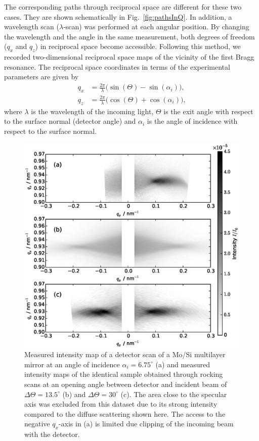 The corresponding paths through reciprocal space are different for these two cases. They are shown schematically in Fig.~\ref{fig:pathsInQ}. In addition, a wavelength scan ($\lambda$-scan) was performed at each angular position. By changing the wavelength and the angle in the same measurement, both degrees of freedom ($q_x$ and $q_z$) in reciprocal space become accessible. Following this method, we recorded two-dimensional reciprocal space maps of the vicinity of the first Bragg resonance. The reciprocal space coordinates in terms of the experimental parameters are given by 
\begin{align}
	q_x &= \frac{2 \pi}{\lambda} \big(\sin(\Theta) - \sin(\alpha_i)\big) \text{,}\\
	q_z &= \frac{2\pi}{\lambda} \big(\cos(\Theta) + \cos(\alpha_i)\big) \text{,} 
\end{align}
where $\lambda$ is the wavelength of the incoming light, $\Theta$ is the exit angle with respect to the surface normal (detector angle) and $\alpha_i$ is the angle of incidence with respect to the surface normal.

\begin{figure}[htbp]
        \includegraphics[width=
        \textwidth]{images/measured_maps} \caption{Measured intensity map of a detector scan of a Mo/Si multilayer mirror at an angle of incidence $\alpha_i = 6.75^\circ$ (a) and  measured intensity maps of the identical sample obtained through rocking scans at an opening angle between detector and incident beam of $\Delta \Theta = 13.5^\circ$ (b) and $\Delta \Theta = 30^\circ$ (c). The area close to the specular axis was excluded from this dataset due to its strong intensity compared to the diffuse scattering shown here. The access to the negative $q_x$-axis in (a) is limited due clipping of the incoming beam with the detector.} \label{fig:comparison} 
\end{figure}

